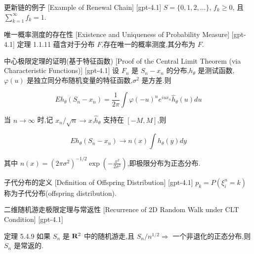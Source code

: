 \documentclass[UTF8]{ctexart}
\begin{document}
    
    
    \begin{xmp}
        {更新链的例子}
        [Example of Renewal Chain]
        [gpt-4.1]
        $S = \{ 0, 1, 2, \ldots \}$, $f_{k} \geq 0$, 且 $\sum_{k=1}^{\infty} f_{k} = 1$.
    \end{xmp}
    
    
    
    \begin{thm}
        {唯一概率测度的存在性}
        [Existence and Uniqueness of Probability Measure]
        [gpt-4.1]
        定理 1.1.11 蕴含对于分布 $F$,存在唯一的概率测度,其分布为 $F$.
    \end{thm}
    
    
    
    \begin{thm}
        {中心极限定理的证明(基于特征函数)}
        [Proof of the Central Limit Theorem (via Characteristic Functions)]
        [gpt-4.1]
        设 $F_n$ 是 $S_n - x_n$ 的分布,$h_\theta$ 是测试函数,$\varphi(u)$ 是独立同分布随机变量的特征函数,$\sigma^2$ 是方差.则

\[
E h_\theta (S_n - x_n) = \frac{1}{2\pi} \int \varphi(-u)^n e^{i u x_n} \hat{h}_\theta(u) du
\]

当 $n \to \infty$ 时,记 $x_n / \sqrt{n} \to x$,$\hat{h}_\theta$ 支持在 $[-M, M]$,则

\[
E h_\theta (S_n - x_n) \to n(x) \int h_\theta(y) dy
\]

其中 $n(x) = (2\pi \sigma^2)^{-1/2} \exp\left(-\frac{x^2}{2\sigma^2}\right)$,即极限分布为正态分布.

    \end{thm}
    
    
    
    \begin{dfn}
        {子代分布的定义}
        [Definition of Offspring Distribution]
        [gpt-4.1]
        $p_{k} = P(\xi_{i}^{n} = k)$ 称为子代分布(offspring distribution).
    \end{dfn}
    
    
    
    \begin{thm}
        {二维随机游走极限定理与常返性}
        [Recurrence of 2D Random Walk under CLT Condition]
        [gpt-4.1]
        
定理 5.4.9 如果 $S_n$ 是 ${\bf R}^2$ 中的随机游走,且 $S_n / n^{1/2} \Rightarrow$ 一个非退化的正态分布,则 $S_n$ 是常返的.

    \end{thm}
    
\end{document}
